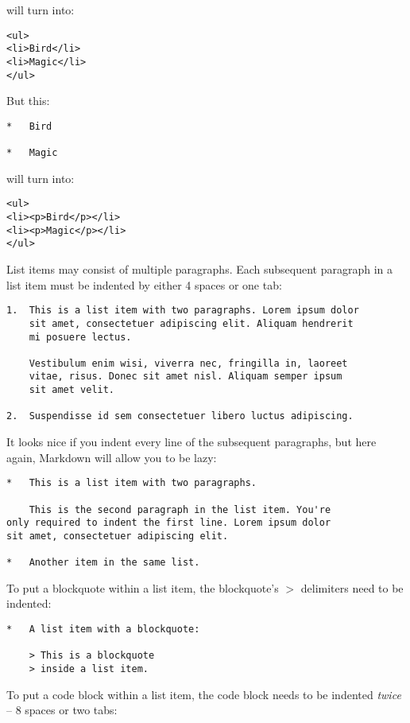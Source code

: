 will turn into:

\begin{verbatim}
<ul>
<li>Bird</li>
<li>Magic</li>
</ul>
\end{verbatim}

But this:

\begin{verbatim}
*   Bird

*   Magic
\end{verbatim}

will turn into:

\begin{verbatim}
<ul>
<li><p>Bird</p></li>
<li><p>Magic</p></li>
</ul>
\end{verbatim}

List items may consist of multiple paragraphs. Each subsequent
paragraph in a list item must be indented by either 4 spaces
or one tab:

\begin{verbatim}
1.  This is a list item with two paragraphs. Lorem ipsum dolor
    sit amet, consectetuer adipiscing elit. Aliquam hendrerit
    mi posuere lectus.

    Vestibulum enim wisi, viverra nec, fringilla in, laoreet
    vitae, risus. Donec sit amet nisl. Aliquam semper ipsum
    sit amet velit.

2.  Suspendisse id sem consectetuer libero luctus adipiscing.
\end{verbatim}

It looks nice if you indent every line of the subsequent
paragraphs, but here again, Markdown will allow you to be
lazy:

\begin{verbatim}
*   This is a list item with two paragraphs.

    This is the second paragraph in the list item. You're
only required to indent the first line. Lorem ipsum dolor
sit amet, consectetuer adipiscing elit.

*   Another item in the same list.
\end{verbatim}

To put a blockquote within a list item, the blockquote's \texttt{$>$}
delimiters need to be indented:

\begin{verbatim}
*   A list item with a blockquote:

    > This is a blockquote
    > inside a list item.
\end{verbatim}

To put a code block within a list item, the code block needs
to be indented \emph{twice} -- 8 spaces or two tabs:

